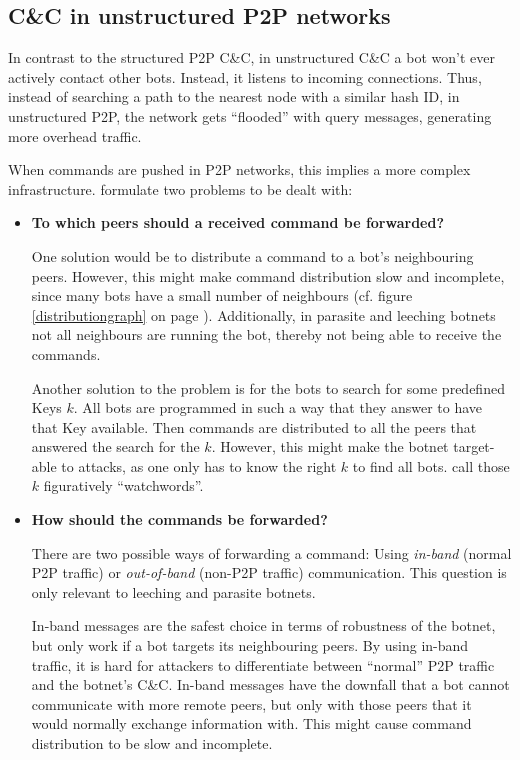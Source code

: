 \documentclass{llncs}
\begin{document}
\subsection{C\&C in unstructured P2P networks}
In contrast to the structured P2P C\&C, in unstructured C\&C a bot
won't ever actively contact other bots. Instead, it listens to
incoming connections.  \cite{li2009botnet} Thus, instead of searching
a path to the nearest node with a similar hash ID, in unstructured
P2P, the network gets ``flooded'' with query messages, generating more
overhead traffic.


When commands are pushed in P2P networks, this implies a more complex
infrastructure. \cite{wang2009systematic} formulate two problems to be dealt
with:

\begin{itemize}
\item {\bf To which peers should a received command be forwarded?}


One solution would be to distribute a command to a bot's neighbouring
peers. However, this might make command distribution slow and
incomplete, since many bots have a small number of neighbours
(cf. figure \ref{distributiongraph} on page
\pageref{distributiongraph}). Additionally, in parasite and leeching
botnets not all neighbours are running the bot, thereby not being
able to receive the commands.


Another solution to the problem is for the bots to search for some
predefined Keys $k$. All bots are programmed in such a way that they
answer to have that Key available. Then commands are distributed to
all the peers that answered the search for the $k$. However, this
might make the botnet target-able to attacks, as one only has to know
the right $k$ to find all bots. \cite{wang2009systematic} call those
$k$ figuratively ``watchwords''.

\item {\bf How should the commands be forwarded?}

There are two possible ways of forwarding a command: Using {\it
  in-band} (normal P2P traffic) or {\it out-of-band} (non-P2P traffic)
communication. This question is only relevant to leeching and
parasite botnets.

In-band messages are the safest choice in terms of robustness of the
botnet, but only work if a bot targets its neighbouring
peers\cite{wang2009systematic}. By using in-band traffic, it is hard
for attackers to differentiate between ``normal'' P2P traffic and the
botnet's C\&C. In-band messages have the downfall that a bot cannot
communicate with more remote peers, but only with those peers that it
would normally exchange information with. This might cause command
distribution to be slow and incomplete.


\end{itemize}
\end{document}
